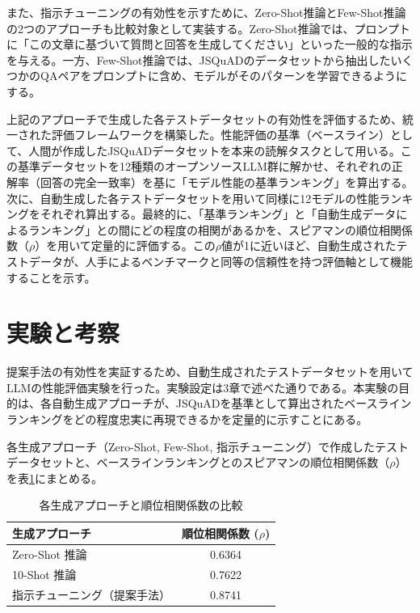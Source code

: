 \documentclass[twocolumn]{jsarticle}
\begin{document}
また、指示チューニングの有効性を示すために、Zero-Shot推論とFew-Shot推論の2つのアプローチも比較対象として実装する。Zero-Shot推論では、プロンプトに「この文章に基づいて質問と回答を生成してください」といった一般的な指示を与える。一方、Few-Shot推論では、JSQuADのデータセットから抽出したいくつかのQAペアをプロンプトに含め、モデルがそのパターンを学習できるようにする。

上記のアプローチで生成した各テストデータセットの有効性を評価するため、統一された評価フレームワークを構築した。性能評価の基準（ベースライン）として、人間が作成したJSQuADデータセットを本来の読解タスクとして用いる。この基準データセットを12種類のオープンソースLLM群に解かせ、それぞれの正解率（回答の完全一致率）を基に「モデル性能の基準ランキング」を算出する。次に、自動生成した各テストデータセットを用いて同様に12モデルの性能ランキングをそれぞれ算出する。最終的に、「基準ランキング」と「自動生成データによるランキング」との間にどの程度の相関があるかを、スピアマンの順位相関係数（$\rho$）を用いて定量的に評価する。この$\rho$値が1に近いほど、自動生成されたテストデータが、人手によるベンチマークと同等の信頼性を持つ評価軸として機能することを示す。



\section{実験と考察}

提案手法の有効性を実証するため、自動生成されたテストデータセットを用いてLLMの性能評価実験を行った。実験設定は3章で述べた通りである。本実験の目的は、各自動生成アプローチが、JSQuAD\cite{JSQuAD}を基準として算出されたベースラインランキングをどの程度忠実に再現できるかを定量的に示すことにある。

各生成アプローチ（Zero-Shot, Few-Shot, 指示チューニング）で作成したテストデータセットと、ベースラインランキングとのスピアマンの順位相関係数（$\rho$）を表\ref{tab:rho_summary}にまとめる。

\begin{table}[h]
  \centering
  \caption{各生成アプローチと順位相関係数の比較}
  \label{tab:rho_summary}
  \begin{tabular}{lc}
  \hline
  生成アプローチ       & 順位相関係数 ($\rho$) \\
  \hline
  Zero-Shot 推論       & 0.6364                     \\
  10-Shot 推論         & 0.7622                     \\
  指示チューニング（提案手法） & 0.8741                     \\
  \hline
  \end{tabular}
\end{table}
\end{document}
